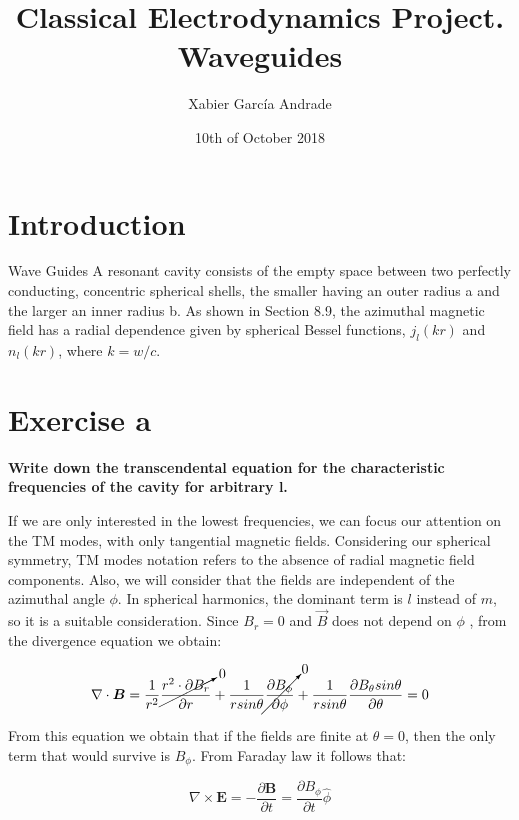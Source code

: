 \documentclass[a4paper,12pt]{article}
\title{Classical Electrodynamics Project. Waveguides}
\author{Xabier García Andrade}
\date{10th of October 2018}
\newcommand{\vect}[1]{\boldsymbol{#1}}
\begin{document}
\maketitle
\tableofcontents

\newpage

\section{Introduction}

Wave Guides A resonant cavity consists of the empty space between two perfectly
conducting, concentric spherical shells, the smaller having an outer radius a and the
larger an inner radius b. As shown in Section 8.9, the azimuthal magnetic field has a
radial dependence given by spherical Bessel functions, $j_l(kr)$ and $n_l(kr)$, where $k =
w/c$.

\section{Exercise a}

\textbf{Write down the transcendental equation for the characteristic frequencies of the
cavity for arbitrary l.}

If we are only interested in the lowest frequencies, we can focus our attention on the TM modes, with only tangential magnetic fields. Considering our spherical symmetry, TM modes notation refers to the absence of radial magnetic field components. Also, we will consider that the fields are independent of the azimuthal angle $ \phi$. In spherical harmonics, the dominant term is $l$ instead of $m$, so it is a suitable consideration. Since $B_r = 0$ and $\vec{B}$ does not depend on $\phi$ , from the divergence equation we obtain: 

\begin{equation}
\nabla \cdot \vect{B} =\frac{1}{r^2} \cancelto{0}{\frac{r^2 \cdot \partial B_{r}}{\partial r}} + \frac{1}{r sin \theta} \cancelto{0}{\frac{\partial B_{\phi}}{\partial \phi}} + \frac{1}{r sin \theta} \frac{\partial B_{\theta} sin \theta}{\partial \theta} = 0
\label{eq:bdiver}
\end{equation}

From this equation we obtain that if the fields are finite at $\theta = 0$, then the only term that would survive is $B_{\phi}$. From Faraday law it follows that: 

\begin{equation}
\nabla \times \vect{E} = -\frac{\partial \vect{B}}{\partial t} = \frac{\partial{B_{\phi}}}{{\partial t}} \hat{\phi}
\label{eq:gauss}
\end{equation}
\end{document}
